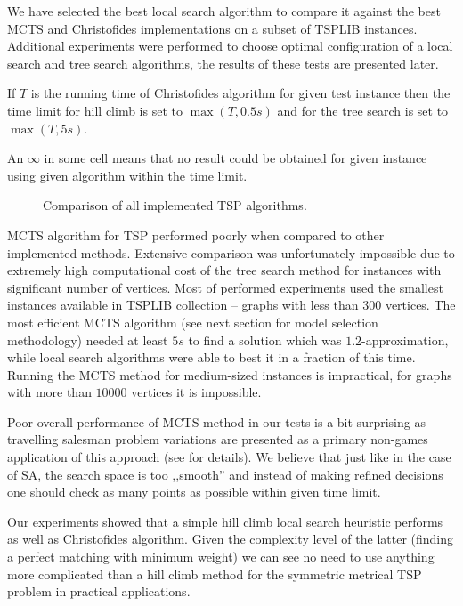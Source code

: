 We have selected the best local search algorithm to compare it against the best
MCTS and Christofides implementations on a subset of TSPLIB instances.
Additional experiments were performed to choose optimal configuration of a
local search and tree search algorithms, the results of these tests are presented
later.

If $T$ is the running time of Christofides algorithm for given test instance
then the time limit for hill climb is set to $\max(T, 0.5 s)$ and for the tree
search is set to $\max(T, 5 s)$.

An $\infty$ in some cell means that no result could be obtained for given
instance using given algorithm within the time limit.

\begin{figure}[ht]
  \centering
  
  \caption{Comparison of all implemented TSP algorithms.}
\end{figure}

MCTS algorithm for TSP performed poorly when compared to other implemented
methods. Extensive comparison was unfortunately impossible due to extremely
high computational cost of the tree search method for instances with
significant number of vertices. Most of performed experiments used the smallest
instances available in TSPLIB collection -- graphs with less than $300$
vertices. The most efficient MCTS algorithm (see next section for model
selection methodology) needed at least $5 s$ to find a solution which was
$1.2$-approximation, while local search algorithms were able to best it in a
fraction of this time. Running the MCTS method for medium-sized instances is
impractical, for graphs with more than $10000$ vertices it is impossible.

Poor overall performance of MCTS method in our tests is a bit surprising as
travelling salesman problem variations are presented as a primary non-games
application of this approach (see \cite{MCTSsurvey} for details). We believe
that just like in the case of SA, the search space is too ,,smooth'' and
instead of making refined decisions one should check as many points as possible
within given time limit.

Our experiments showed that a simple hill climb local search heuristic performs
as well as Christofides algorithm. Given the complexity level of the latter
(finding a perfect matching with minimum weight) we can see no need to use
anything more complicated than a hill climb method for the symmetric metrical
TSP problem in practical applications.

